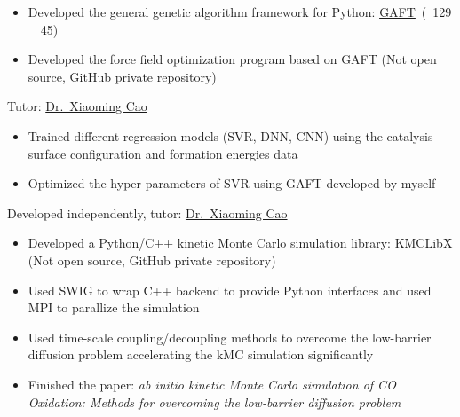\documentclass{resume}
\begin{document}
\begin{onehalfspacing}
\begin{itemize}
    \item Developed the general genetic algorithm framework for Python: \faLink \href{https://github.com/PytLab/gaft}{GAFT}\ (\faStar\ 129 \ \faCodeFork\ 45)
  \item Developed the force field optimization program based on GAFT (Not open source, GitHub private repository)
\end{itemize}
\end{onehalfspacing}

 {Tutor: \faLink \href{http://chem.ecust.edu.cn/2014/1211/c6655a50467/page.htm}{Dr.\ Xiaoming Cao}}
\begin{onehalfspacing}
\begin{itemize}
    \item Trained different regression models (SVR, DNN, CNN) using the catalysis surface configuration and formation energies data
    \item Optimized the hyper-parameters of SVR using GAFT developed by myself
\end{itemize}
\end{onehalfspacing}

 {Developed independently, tutor: \faLink \href{http://chem.ecust.edu.cn/2014/1211/c6655a50467/page.htm}{Dr.\ Xiaoming Cao}}
\begin{onehalfspacing}
\begin{itemize}
    \item Developed a Python/C++ kinetic Monte Carlo simulation library: KMCLibX (Not open source, GitHub private repository)
    \item Used SWIG to wrap C++ backend to provide Python interfaces and used MPI to parallize the simulation
    \item Used time-scale coupling/decoupling methods to overcome the low-barrier diffusion problem accelerating the kMC simulation significantly
    \item Finished the paper: \emph{ab initio kinetic Monte Carlo simulation of CO Oxidation: Methods for overcoming the low-barrier diffusion problem}
\end{itemize}
\end{onehalfspacing}
\end{document}
